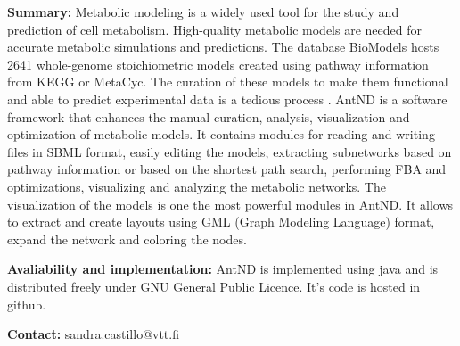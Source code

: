 
\textbf{Summary:} Metabolic modeling is a widely used tool for the study and prediction of cell metabolism. High-quality metabolic models are needed for accurate metabolic simulations and predictions. The database BioModels \cite{juty_biomodels:_2015} hosts 2641 whole-genome stoichiometric models created using pathway information from KEGG or MetaCyc. The curation of these models to make them functional and able to predict experimental data is a tedious process \cite{thiele_protocol_2010}. AntND is a software framework that enhances the manual curation, analysis, visualization and optimization of metabolic models. It contains modules for reading and writing files in SBML format, easily editing the models, extracting subnetworks based on pathway information or based on the shortest path search, performing FBA and optimizations, visualizing and analyzing the metabolic networks. The visualization of the models is one the most powerful modules in AntND. It allows to extract and create layouts using GML (Graph Modeling Language) format, expand the network and coloring the nodes.

\textbf{Avaliability and implementation:} AntND is implemented using java and is distributed freely under GNU General Public Licence. It's code is hosted in github. 

\textbf{Contact:} sandra.castillo@vtt.fi
